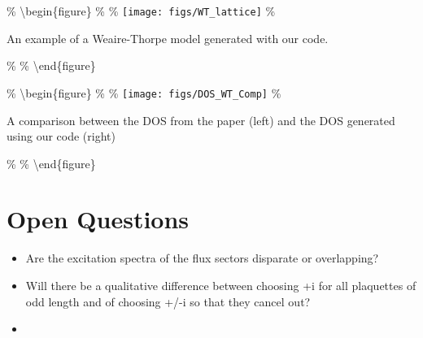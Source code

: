 \% \textbackslash begin\{figure\} \% \centering \%
\texttt{[image: figs/WT\_lattice]} \%

\caption{An example of a Weaire-Thorpe model generated with our code.}

\% \label{fig:WT_lattice} \% \textbackslash end\{figure\}

\% \textbackslash begin\{figure\} \% \centering \%
\texttt{[image: figs/DOS\_WT\_Comp]} \%

\caption{A comparison between the DOS from the paper (left) and the DOS generated using our code (right)}

\% \label{fig:DOS_WT_Comp} \% \textbackslash end\{figure\}

\section{Open Questions}
\begin{itemize}
    \item Are the excitation spectra of the flux sectors disparate or overlapping?
    \item Will there be a qualitative difference between choosing +i for all plaquettes of odd length and of choosing +/-i so that they cancel out?
    \item
\end{itemize}
